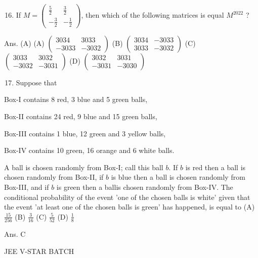 \documentclass[10pt]{article}
\begin{document}
\begin{enumerate}
  \setcounter{enumi}{15}
  \item If $M=\left(\begin{array}{cc}\frac{5}{2} & \frac{3}{2} \\ -\frac{3}{2} & -\frac{1}{2}\end{array}\right)$, then which of the following matrices is equal $M^{2022}$ ?
\end{enumerate}

Ans. (A)
(A) $\left(\begin{array}{cc}3034 & 3033 \\ -3033 & -3032\end{array}\right)$
(B) $\left(\begin{array}{ll}3034 & -3033 \\ 3033 & -3032\end{array}\right)$
(C) $\left(\begin{array}{cc}3033 & 3032 \\ -3032 & -3031\end{array}\right)$
(D) $\left(\begin{array}{cc}3032 & 3031 \\ -3031 & -3030\end{array}\right)$

\begin{enumerate}
  \setcounter{enumi}{16}
  \item Suppose that
\end{enumerate}

Box-I contains 8 red, 3 blue and 5 green balls,

Box-II contains 24 red, 9 blue and 15 green balls,

Box-III contains 1 blue, 12 green and 3 yellow balls,

Box-IV contains 10 green, 16 orange and 6 white balls.

A ball is chosen randomly from Box-I; call this ball $b$. If $b$ is red then a ball is chosen randomly from Box-II, if $b$ is blue then a ball is chosen randomly from Box-III, and if $b$ is green then a ballis chosen randomly from Box-IV. The conditional probability of the event 'one of the chosen balls is white' given that the event 'at least one of the chosen balls is green' has happened, is equal to
(A) $\frac{15}{256}$
(B) $\frac{3}{16}$
(C) $\frac{5}{52}$
(D) $\frac{1}{8}$

Ans. $\mathrm{C}$

JEE V-STAR BATCH
\end{document}
